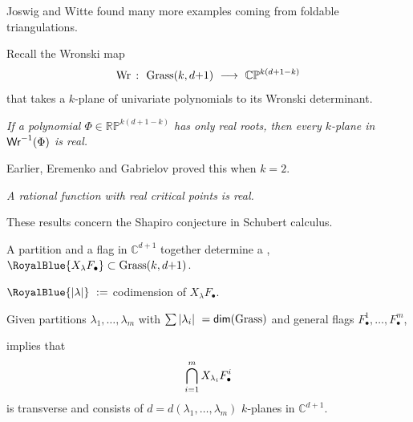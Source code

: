 \documentclass[17pt,landscape]{Narrow}
\newcommand{\DeCo}{\RoyalBlue}
\renewcommand{\P}{{\mathbb P}}
\newcommand{\C}{{\mathbb C}}
\newcommand{\R}{{\mathbb R}}
\begin{document}
\begin{flushleft}
Joswig and Witte found many more examples coming from foldable triangulations.



\slide{}
\LogoOn
\begin{center}
\end{center}

Recall the Wronski map\vspace{-8pt}
\[
   \mbox{Wr}\ \colon\ \mbox{Grass}(k,d{+}1) \ \longrightarrow\ \C\P^{k(d+1-k)}\vspace{-8pt}
\]
that takes a $k$-plane of univariate polynomials to its Wronski determinant.


{\sl 
 If a polynomial $\Phi\in\R\P^{k(d+1-k)}$ has only real roots, then
 every $k$-plane in $\mbox{\sf Wr}^{-1}(\Phi)$ is real.
}

Earlier, Eremenko and Gabrielov proved this when $k=2$.

{\sl 
  A rational function with real critical points is real.
}

These results concern the Shapiro conjecture in Schubert calculus.

\slide{}
\LogoOn
\begin{center}
\end{center}

A partition \DeCo{$\lambda$} and a flag \DeCo{$F_\bullet$} in $\C^{d+1}$
together determine a \newline\DeCo{Schubert variety},
$\DeCo{X_\lambda F_\bullet}\subset\mbox{Grass}(k,d{+}1)$.

$\DeCo{|\lambda|}\ :=$ codimension of $X_\lambda F_\bullet$.

Given partitions $\lambda_1,\dotsc,\lambda_m$ with 
$\sum|\lambda_i|\ =\mbox{\sf dim}(\mbox{Grass})$ and\newline
general flags $F_\bullet^1,\dotsc,F_\bullet^m$,

 implies that\vspace{-8pt}
\[
   \bigcap_{i=1}^m X_{\lambda_i}F_\bullet^i\vspace{-8pt}
\]
 is transverse and consists of
$d=d(\lambda_1,\dotsc,\lambda_m)$ $k$-planes in $\C^{d+1}$.





\end{flushleft}
\end{document}
